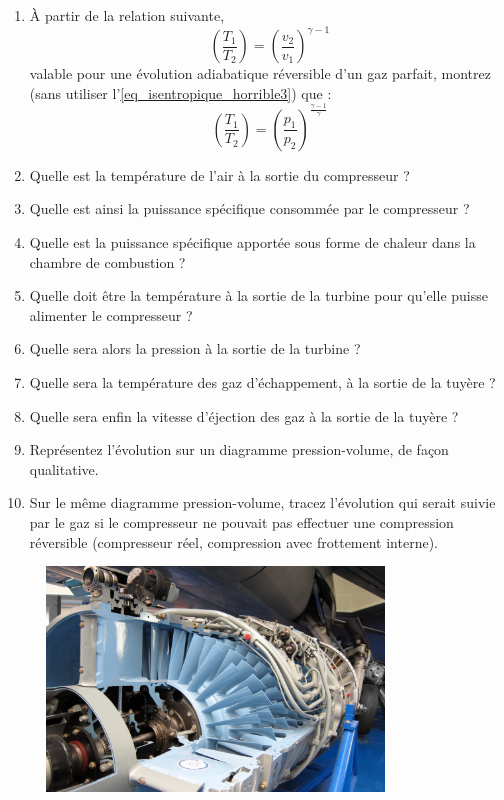 	\begin{enumerate}
		\item À partir de la relation suivante,
			\begin{equation*}
				\left( \frac{T_1}{T_2} \right)	= \left( \frac{v_2}{v_1} \right)^{\gamma -1}
			\end{equation*}
			valable pour une évolution adiabatique réversible d’un gaz parfait, montrez (sans utiliser l’\cref{eq_isentropique_horrible3}) que :			
			\begin{equation*}
				\left( \frac{T_1}{T_2} \right)	=  \left( \frac{p_1}{p_2} \right)^{\frac{\gamma -1}{\gamma}}
			\end{equation*}
		\item Quelle est la température de l’air à la sortie du compresseur ?
		\item Quelle est ainsi la puissance spécifique consommée par le compresseur ?
		\item Quelle est la puissance spécifique apportée sous forme de chaleur dans la chambre de combustion ?
		\item Quelle doit être la température à la sortie de la turbine pour qu’elle puisse alimenter le compresseur ?
		\item Quelle sera alors la pression à la sortie de la turbine ?
		\item Quelle sera la température des gaz d’échappement, à la sortie de la tuyère ?
		\item Quelle sera enfin la vitesse d’éjection des gaz à la sortie de la tuyère ?
		\item Représentez l’évolution sur un diagramme pression-volume, de façon qualitative.
		\item Sur le même diagramme pression-volume, tracez l’évolution qui serait suivie par le gaz si le compresseur ne pouvait pas effectuer une compression réversible (compresseur réel, compression avec frottement interne).
	\end{enumerate}

	
	\begin{figure}[bth]
		\begin{center}
			\includegraphics[width=0.8\textwidth]{images/atar_compressor.jpg}
		\end{center}
		\label{fig_exo_compresseur_turbojet}
	\end{figure}


